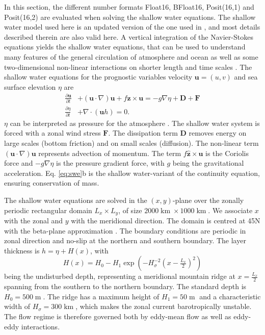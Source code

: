 \documentclass[draft]{agujournal2019}
\newcommand{\op}{\operatorname}
\begin{document}
In this section, the different number formats Float16, BFloat16, Posit(16,1) and
Posit(16,2) are evaluated when solving the shallow water equations. The shallow
water model used here is an updated version of the one used in ,
and most details described therein are also valid here. A vertical integration of
the Navier-Stokes equations yields the shallow water equations, that can be used
to understand many features of the general circulation of atmosphere and ocean as
well as some two-dimensional non-linear interactions on shorter length and time scales
\cite{Gill1982,Vallis2006}. The shallow water equations for the prognostic variables
velocity $\mathbf{u} = (u,v)$ and sea surface elevation $\eta$ are
\begin{subequations}
\begin{align}
\frac{\partial \mathbf{u}}{\partial t} &+ (\mathbf{u} \cdot \nabla) \mathbf{u} +
f\hat{\mathbf{z}} \times \mathbf{u} = -g\nabla \eta + \mathbf{D} + \mathbf{F} \\
\frac{\partial \eta}{\partial t} &+ \nabla \cdot (\mathbf{u}h) = 0.
\end{align}
\label{eq:swe}%
\end{subequations}
$\eta$ can be interpreted as pressure for the atmosphere \cite{Gill1982}.
The shallow water system is forced with a zonal wind stress $\mathbf{F}$.
The dissipation term $\mathbf{D}$ removes energy on large scales (bottom friction)
and on small scales (diffusion). The non-linear term $(\mathbf{u} \cdot \nabla) \mathbf{u}$
represents advection of momentum. The term $f\hat{\mathbf{z}} \times \mathbf{u}$
is the Coriolis force and $-g\nabla \eta$ is the pressure gradient force, with
$g$ being the gravitational acceleration. Eq. \ref{eq:swe}b is the shallow
water-variant of the continuity equation, ensuring conservation of mass.

The shallow water equations are solved in the $(x,y)$-plane over the zonally periodic
rectangular domain $L_x \times L_y$, of size $2000\op{km} \times 1000\op{km}$.
We associate $x$ with the zonal and $y$ with the meridional direction. The domain
is centred at 45N with the beta-plane approximation \cite{Vallis2006}. The boundary
conditions are periodic in zonal direction and no-slip at the northern and southern
boundary. The layer thickness is $h = \eta + H(x)$, with
\begin{equation}
H(x) = H_0 - H_1\exp\left(-H_\sigma^{-2}(x-\tfrac{L_x}{2})^2\right)
\end{equation}
being the undisturbed depth, representing a meridional mountain ridge at
$x=\tfrac{L_x}{2}$ spanning from the southern to the northern boundary.
The standard depth is $H_0 = 500\op{m}$. The ridge has a maximum height of
$H_1 = 50\op{m}$ and a characteristic width of $H_\sigma = 300\op{km}$, which
makes the zonal current barotropically unstable. The flow regime is therefore
governed both by eddy-mean flow as well as eddy-eddy interactions.
\end{document}
